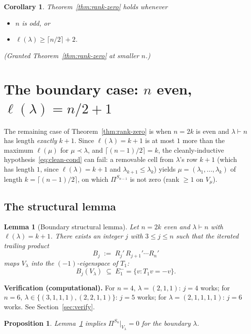 \documentclass[11pt]{article}
\newtheorem{lemma}[theorem]{Lemma}
\newtheorem{proposition}[theorem]{Proposition}
\newtheorem{corollary}[theorem]{Corollary}
\theoremstyle{definition}
\begin{document}
\begin{corollary}\label{cor:clean-cases}
Theorem~\ref{thm:rank-zero} holds whenever
\begin{itemize}[topsep=0.3em,itemsep=0.2em,leftmargin=2em]
\item $n$ is odd, or
\item $\ell(\lambda) \ge \lceil n/2\rceil + 2$.
\end{itemize}
(Granted Theorem~\ref{thm:rank-zero} at smaller $n$.)
\end{corollary}

\section{The boundary case: $n$ even, $\ell(\lambda)=n/2+1$}
\label{sec:boundary}

The remaining case of Theorem~\ref{thm:rank-zero} is when $n=2k$ is
even and $\lambda\vdash n$ has length \emph{exactly} $k+1$. Since
$\ell(\lambda)=k+1$ is at most $1$ more than the maximum
$\ell(\mu)$ for $\mu\prec\lambda$, and $\lceil(n-1)/2\rceil=k$,
the cleanly-inductive hypothesis~\eqref{eq:clean-cond} can fail:
a removable cell from $\lambda$'s row $k+1$ (which has length $1$,
since $\ell(\lambda)=k+1$ and $\lambda_{k+1}\le\lambda_k$) yields
$\mu = (\lambda_1,\ldots,\lambda_k)$ of length $k = \lceil(n-1)/2\rceil$,
on which $\Pi^{S_{n-1}}$ is not zero (rank $\ge 1$ on $V_\mu$).

\subsection{The structural lemma}

\begin{lemma}[Boundary structural lemma]\label{lem:boundary}
Let $n=2k$ even and $\lambda\vdash n$ with $\ell(\lambda)=k+1$.
There exists an integer $j$ with $3 \le j \le n$ such that the
iterated trailing product
\[
   B_j \;:=\; R_j'\,R_{j+1}'\cdots R_n'
\]
maps $V_\lambda$ into the $(-1)$-eigenspace of $T_1$:
\[
   B_j(V_\lambda) \;\subseteq\; E_1^- = \{v : T_1 v = -v\}.
\]
\end{lemma}

\noindent\textbf{Verification (computational).} For $n=4$,
$\lambda=(2,1,1)$: $j=4$ works; for $n=6$, $\lambda\in\{(3,1,1,1),
(2,2,1,1)\}$: $j=5$ works; for $\lambda=(2,1,1,1,1)$: $j=6$ works.
See Section~\ref{sec:verify}.

\begin{proposition}\label{prop:boundary-suffices}
Lemma~\ref{lem:boundary} implies $\Pi^{S_n}|_{V_\lambda}=0$ for the
boundary $\lambda$.
\end{proposition}
\end{document}
